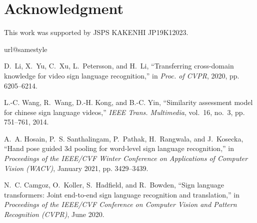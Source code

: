 \documentclass[journal]{IEEEtran}
\begin{document}
\section*{Acknowledgment}
This work was supported by JSPS KAKENHI JP19K12023.




\ifCLASSOPTIONcaptionsoff
  \newpage
\fi








\begin{thebibliography}{10}
	\providecommand{\url}[1]{#1}
	\csname url@samestyle\endcsname
	\providecommand{\newblock}{\relax}
	\providecommand{\bibinfo}[2]{#2}
	\providecommand{\BIBentrySTDinterwordspacing}{\spaceskip=0pt\relax}
	\providecommand{\BIBentryALTinterwordstretchfactor}{4}
	\providecommand{\BIBentryALTinterwordspacing}{\spaceskip=\fontdimen2\font plus
		\BIBentryALTinterwordstretchfactor\fontdimen3\font minus
		\fontdimen4\font\relax}
	\providecommand{\BIBforeignlanguage}[2]{{\expandafter\ifx\csname l@#1\endcsname\relax
			\typeout{** WARNING: IEEEtran.bst: No hyphenation pattern has been}\typeout{** loaded for the language `#1'. Using the pattern for}\typeout{** the default language instead.}\else
			\language=\csname l@#1\endcsname
			\fi
			#2}}
	\providecommand{\BIBdecl}{\relax}
	\BIBdecl
	
	D.~Li, X.~Yu, C.~Xu, L.~Petersson, and H.~Li, ``Transferring cross-domain
	knowledge for video sign language recognition,'' in \emph{Proc. of CVPR},
	2020, pp. 6205--6214.
	
	L.-C. Wang, R.~Wang, D.-H. Kong, and B.-C. Yin, ``Similarity assessment model
	for chinese sign language videos,'' \emph{IEEE Trans. Multimedia}, vol.~16,
	no.~3, pp. 751--761, 2014.
	
	A.~A. Hosain, P.~S. Santhalingam, P.~Pathak, H.~Rangwala, and J.~Kosecka,
	``Hand pose guided 3d pooling for word-level sign language recognition,'' in
	\emph{Proceedings of the IEEE/CVF Winter Conference on Applications of
		Computer Vision (WACV)}, January 2021, pp. 3429--3439.
	
	N.~C. Camgoz, O.~Koller, S.~Hadfield, and R.~Bowden, ``Sign language
	transformers: Joint end-to-end sign language recognition and translation,''
	in \emph{Proceedings of the IEEE/CVF Conference on Computer Vision and
		Pattern Recognition (CVPR)}, June 2020.
	

\end{thebibliography}
\end{document}
